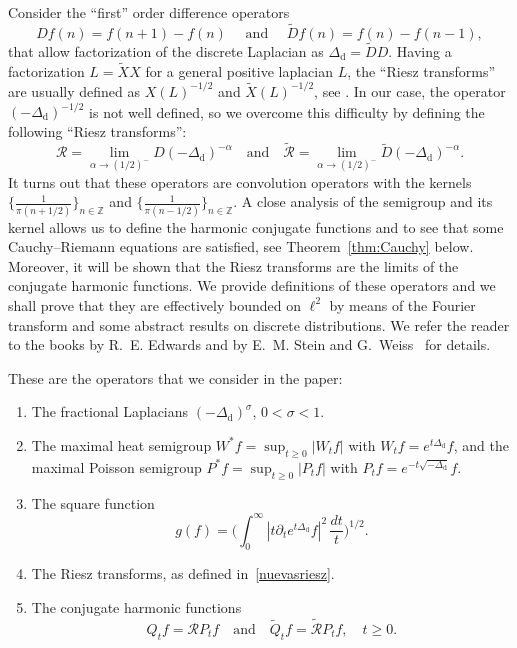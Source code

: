 \documentclass[11pt]{amsart}
\numberwithin{equation}{section}
\newcommand{\Z}{\mathbb{Z}}
\newcommand{\dis}{\mathrm{d}}
\theoremstyle{plain}
\theoremstyle{remark}
\begin{document}
Consider the ``first'' order difference operators
\begin{equation}
\label{factorizacion}
Df(n)=f(n+1)-f(n)\quad\text{ and }\quad
\widetilde{D} f(n)=f(n)-f(n-1),
\end{equation}
that allow factorization of the discrete Laplacian as $\Delta_{\dis} = \widetilde{D} D$.
Having a factorization $L= \widetilde{X}X$ for a general positive laplacian $L$, the ``Riesz transforms'' are usually defined as $X(L)^{-1/2}$ and $\widetilde{X}(L)^{-1/2}$, see \cite{Th1, Th2}. In our case, the operator $(-\Delta_{\dis})^{-1/2}$ is not well defined, so we overcome this difficulty by defining the following ``Riesz transforms'':
\begin{equation}
\label{nuevasriesz}
\mathcal{R}= \lim_{\alpha \to (1/2)^-}D(-\Delta_{\dis})^{-\alpha}
\quad\text{and}\quad
\widetilde{\mathcal{R}}= \lim_{\alpha \to (1/2)^-}\widetilde{D}(-\Delta_{\dis})^{-\alpha}.
\end{equation}
It turns out that these operators are convolution operators with the kernels $\{\frac1{\pi(n+1/2)}\}_{n\in \Z} $ and $\{\frac1{\pi(n-1/2)}\}_{n\in \Z}$. A close analysis of the semigroup and its kernel allows us to define the harmonic conjugate functions and to see that some Cauchy--Riemann equations are satisfied, see Theorem~\ref{thm:Cauchy} below. Moreover, it will be shown that the Riesz transforms are the limits of the conjugate harmonic functions. We provide definitions of these operators and we shall prove that they are effectively bounded on $\ell^2$ by means of the Fourier transform and some abstract results on discrete distributions. We refer the reader to the books by R.~E. Edwards \cite{Edwards} and by E.~M. Stein and G.~Weiss~\cite{StWe} for details.

These are the operators that we consider in the paper:
\begin{enumerate}
\item[(i)] The fractional Laplacians $(-\Delta_{\dis})^\sigma$, $0<\sigma<1$.
\item[(ii)] The maximal heat semigroup $W^*f= \sup_{t\ge0} |W_tf|$
with $W_tf = e^{t\Delta_{\dis}}f$,
and the maximal Poisson semigroup
$P^*f= \sup_{t\ge0} |P_tf|$
with $P_tf = e^{-t\sqrt{-\Delta_{\dis}}}f$.
\item[(iii)] The square function
\[
g(f) = \Big( \int_0^\infty |t\partial_t e^{t\Delta_{\dis}}f|^2 \,\frac{dt}{t} \Big)^{1/2}.
\]
\item[(iv)] The Riesz transforms, as defined in~\eqref{nuevasriesz}.
\item[(v)] The conjugate harmonic functions
\[
Q_t f= \mathcal{R}  P_t f  \quad\text{and}\quad  \widetilde{Q}_tf = \widetilde{\mathcal{R}}P_t f, \quad t\ge0.
\]
\end{enumerate}
\end{document}
